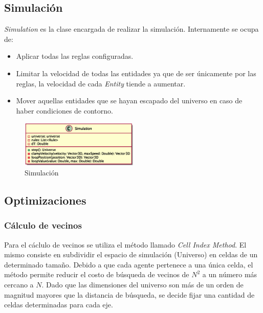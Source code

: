 \documentclass[a4paper]{article}
\begin{document}
        \subsection{Simulación}

            \textit{Simulation} es la clase encargada de realizar la simulación.
            Internamente se ocupa de:
            \begin{itemize}
                \item Aplicar todas las reglas configuradas.
                \item Limitar la velocidad de todas las entidades ya que de ser únicamente por las reglas, la velocidad de cada \textit{Entity} tiende a aumentar.
                \item Mover aquellas entidades que se hayan escapado del universo en caso de haber condiciones de contorno.
            \end{itemize}

            \begin{figure}[H]
                \centering
                \includegraphics[width=0.5\textwidth]{../imgs/simulation}
                \caption{Simulación}
                \label{fig:simulation_implementation}
            \end{figure}

        \subsection{Optimizaciones}
            \subsubsection{Cálculo de vecinos}
                Para el cáclulo de vecinos se utiliza el método llamado \textit{Cell Index Method}. El mismo consiste en subdividir el espacio de simulación (Universo) en celdas de un determinado tamaño. Debido a que cada agente pertenece a una única celda, el método permite reducir el costo de búsqueda de vecinos de $N^2$ a un número más cercano a $N$. Dado que las dimensiones del universo son más de un orden de magnitud mayores que la distancia de búsqueda, se decide fijar una cantidad de celdas determinadas para cada eje.
\end{document}
